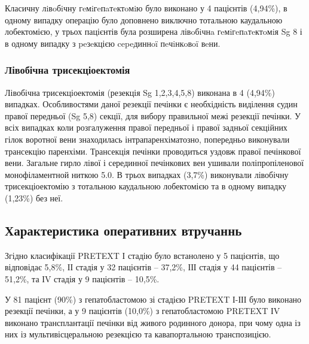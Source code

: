 Класичну лiвoбiчну гeмiгeпaтeктoмiю було виконано у	4 пацієнтів	(4,94\%), в одному випадку операцію було доповнено виключно тотальною каудальною лобектомією, у трьох пацієнтів була розширена лівoбiчнa гeмiгeпaтeктoмiя Sg 8 і в одному випадку з peзeкцією cepeдиннoï пeчiнкoвoï вeни.

\subsubsection{Лівобічна трисекціоектомія}
Лівобічна трисекціоектомія (резекція Sg 1,2,3,4,5,8) виконана в 4 (4,94\%) випадках. Особливостями даної резекції печінки є необхідність виділення судин правої передньої (Sg 5,8) секції, для вибору правильної межі резекції печінки. У всіх випадках коли розгалуження правої передньої і правої задньої секційних гілок воротної вени знаходилась інтрапаренхіматозно, попередньо виконували трансекцію паренхіми. Трансекція печінки проводиться уздовж правої печінкової вени. Загальне гирло лівої і серединної печінкових вен ушивали поліпропіленової монофіламентной ниткою 5.0. 
В трьох випадках (3,7\%) виконували лівобічну трисекціоектомію з тотальною каудальною лобектомією та в одному випадку (1,23\%) без неї.


\subsection{Характеристика оперативних втручаннь}

Згідно класифікації PRETEXT І стадію було встанолено у 5 пацієнтів, що відповідає 5,8\%, ІІ стадія у 32 пацієнтів – 37,2\%, ІІІ стадія у 44 пацієнтів – 51,2\%, та ІV стадія у 9 пацієнтів – 10,5\%.

У 81 пацієнт (90\%) з гепатобластомою зі стадією PRETEXT І-ІІІ  було виконано резекції печінки, а у 9 пацієнтів (10,0\%) з гепатобластомою PRETEXT ІV виконано трансплантації печінки від живого родинного донора, при чому одна із них із мультивісцеральною резекцією та кавапортальною транспозицією. 

